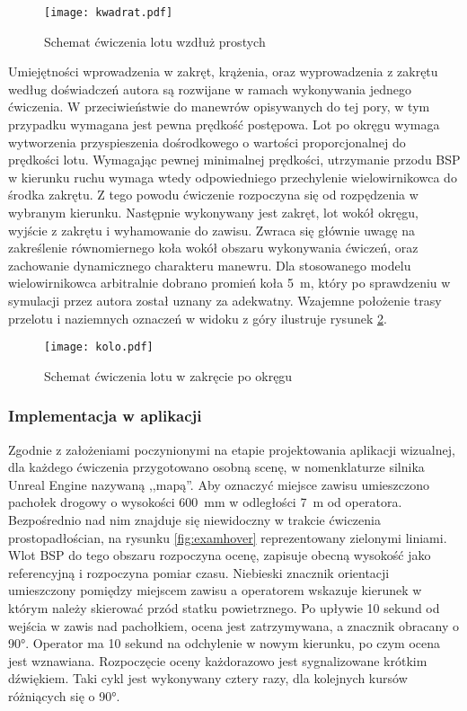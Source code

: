\begin{figure}[!h]
    \centering \texttt{[image: kwadrat.pdf]}
    \caption{Schemat ćwiczenia lotu wzdłuż prostych}
    \label{fig:kwadrat}
\end{figure}

Umiejętności wprowadzenia w zakręt, krążenia, oraz wyprowadzenia z zakrętu według doświadczeń autora są rozwijane w ramach wykonywania jednego ćwiczenia. W przeciwieństwie do manewrów opisywanych do tej pory, w tym przypadku wymagana jest pewna prędkość postępowa. Lot po okręgu wymaga wytworzenia przyspieszenia dośrodkowego o wartości proporcjonalnej do prędkości lotu. Wymagając pewnej minimalnej prędkości, utrzymanie przodu BSP w kierunku ruchu wymaga wtedy odpowiedniego przechylenie wielowirnikowca do środka zakrętu. Z tego powodu ćwiczenie rozpoczyna się od rozpędzenia w wybranym kierunku. Następnie wykonywany jest zakręt, lot wokół okręgu, wyjście z zakrętu i wyhamowanie do zawisu. Zwraca się głównie uwagę na zakreślenie równomiernego koła wokół obszaru wykonywania ćwiczeń, oraz zachowanie dynamicznego charakteru manewru. Dla stosowanego modelu wielowirnikowca arbitralnie dobrano promień koła 5~m, który po sprawdzeniu w symulacji przez autora został uznany za adekwatny. Wzajemne położenie trasy przelotu i naziemnych oznaczeń w widoku z góry ilustruje rysunek \ref{fig:kolo}.

\begin{figure}[!h]
    \centering \texttt{[image: kolo.pdf]}
    \caption{Schemat ćwiczenia lotu w zakręcie po okręgu}
    \label{fig:kolo}
\end{figure}

\subsubsection{Implementacja w aplikacji}
Zgodnie z założeniami poczynionymi na etapie projektowania aplikacji wizualnej, dla każdego ćwiczenia przygotowano osobną scenę, w nomenklaturze silnika Unreal Engine nazywaną ,,mapą''. Aby oznaczyć miejsce zawisu umieszczono pachołek drogowy o wysokości 600~mm w odległości 7~m od operatora. Bezpośrednio nad nim znajduje się niewidoczny w trakcie ćwiczenia prostopadłościan, na rysunku \ref{fig:examhover} reprezentowany zielonymi liniami. Wlot BSP do tego obszaru rozpoczyna ocenę, zapisuje obecną wysokość jako referencyjną i rozpoczyna pomiar czasu. Niebieski znacznik orientacji umieszczony pomiędzy miejscem zawisu a operatorem wskazuje kierunek w którym należy skierować przód statku powietrznego. Po upływie 10 sekund od wejścia w zawis nad pachołkiem, ocena jest zatrzymywana, a znacznik obracany o 90°. Operator ma 10 sekund na odchylenie w nowym kierunku, po czym ocena jest wznawiana. Rozpoczęcie oceny każdorazowo jest sygnalizowane krótkim dźwiękiem. Taki cykl jest wykonywany cztery razy, dla kolejnych kursów różniących się o 90°.

